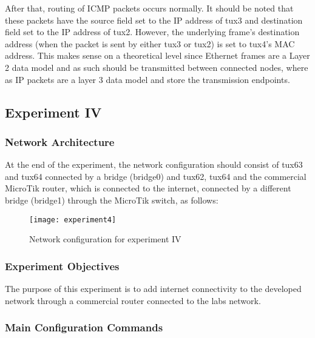 After that, routing of ICMP packets occurs normally. It should be noted that these packets have the source field set to the IP address of tux3 and destination field set to the IP address of tux2. However, the underlying frame's destination address (when the packet is sent by either tux3 or tux2) is set to tux4's MAC address.
This makes sense on a theoretical level since Ethernet frames are a Layer 2 data model and as such should be transmitted between connected nodes, where as IP packets are a layer 3 data model and store the transmission endpoints.

\subsection{Experiment IV}

\subsubsection{Network Architecture}

At the end of the experiment, the network configuration should consist of tux63 and tux64 connected by a bridge (bridge0) and tux62, tux64 and the commercial MicroTik router, which is connected to the internet, connected by a different bridge (bridge1) through the MicroTik switch, as follows:

\begin{figure}[H]
    \centering
    \texttt{[image: experiment4]}
    \caption{Network configuration for experiment IV}
\end{figure}

\subsubsection{Experiment Objectives}

The purpose of this experiment is to add internet connectivity to the developed network through a commercial router connected to the labs network.

\subsubsection{Main Configuration Commands}

